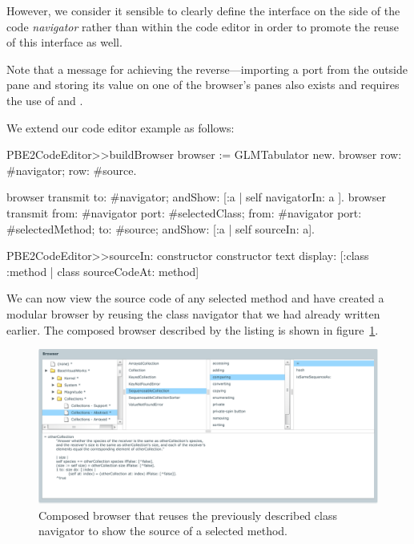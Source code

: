 \documentclass[a4paper,10pt,twoside]{book}
\begin{document}
However, we consider it sensible to clearly define the interface on
the side of the code \emph{navigator} rather than within the code
editor in order to promote the reuse of this interface as well.

Note that a message for achieving the reverse---importing a port from
the outside pane and storing its value on one of the browser's panes
also exists and requires the use of  and .

We extend our code editor example as follows:

\begin{code}{}
PBE2CodeEditor>>buildBrowser 
	browser := GLMTabulator new.
	browser 
		row: #navigator;
		row: #source.
		
	browser transmit to: #navigator; andShow:  [:a | self navigatorIn: a ]. 
	browser transmit
		from:  #navigator port: #selectedClass;
		from: #navigator port: #selectedMethod;
		to: #source;
		andShow:  [:a | self sourceIn: a].

PBE2CodeEditor>>sourceIn: constructor
	constructor text
		display: [:class :method | class sourceCodeAt: method] 
\end{code}


We can now view the source code of any selected method and have
created a modular browser by reusing the class navigator that we had
already written earlier. The composed browser described by the listing
is shown in figure~\ref{fig:composed-browser}.

\begin{figure}[htbp]
\centerline{\includegraphics[width=\linewidth]{classbrowser.pdf}}
\caption{Composed browser that reuses the previously described class navigator to show the source of a selected method.}
\label{fig:composed-browser}
\end{figure}


\end{document}
